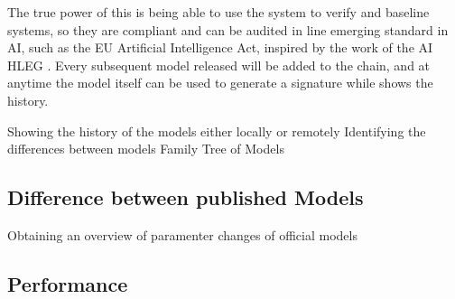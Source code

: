 The true power of this is being able to use the system to verify and baseline systems, so they are compliant and can be audited in line emerging standard in AI, such as the EU Artificial Intelligence Act, inspired by the work of the AI HLEG \cite{high-level_expert_group_on_ai_ethics_2019}. Every subsequent model released will be added to the chain, and at anytime the model itself can be used to generate a signature while shows the history.

    Showing the history of the models either locally or remotely
    Identifying the differences between models
    Family Tree of Models

\subsection{Difference between published Models}
    Obtaining an overview of paramenter changes of official models

\subsection{Performance}






